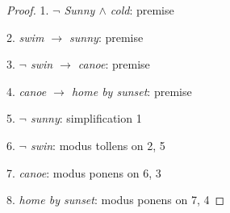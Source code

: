 \begin{proof}

1. \textit{$\lnot$ Sunny $\land$ cold}: premise

2. \textit{swim $\rightarrow$ sunny}: premise

3. \textit{$\lnot$ swin $\rightarrow$ canoe}: premise

4. \textit{canoe $\rightarrow$ home by sunset}: premise

5. \textit{$\lnot$ sunny}: simplification 1

6. \textit{$\lnot$ swin}: modus tollens on 2, 5

7. \textit{canoe}: modus ponens on 6, 3

8. \textit{home by sunset}: modus ponens on 7, 4

\end{proof}




